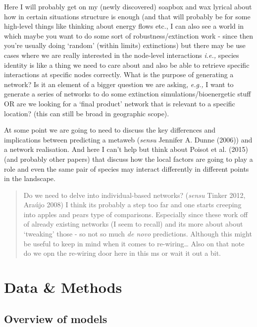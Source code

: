 \documentclass[
]{agujournal2019}
\begin{document}
Here I will probably get on my (newly discovered) soapbox and wax
lyrical about how in certain situations structure is enough (and that
will probably be for some high-level things like thinking about energy
flows etc., I can also see a world in which maybe you want to do some
sort of robustness/extinction work - since then you're usually doing
`random' (within limits) extinctions) but there may be use cases where
we are really interested in the node-level interactions \emph{i.e.,}
species identity is like a thing we need to care about and also be able
to retrieve specific interactions at specific nodes correctly. What is
the purpose of generating a network? Is it an element of a bigger
question we are asking, \emph{e.g.,} I want to generate a series of
networks to do some extinction simulations/bioenergetic stuff OR are we
looking for a `final product' network that is relevant to a specific
location? (this can still be broad in geographic scope).

At some point we are going to need to discuss the key differences and
implications between predicting a metaweb (\emph{sensu} Jennifer A.
Dunne (2006)) and a network realisation. And here I can't help but think
about Poisot et al. (2015) (and probably other papers) that discuss how
the local factors are going to play a role and even the same pair of
species may interact differently in different points in the landscape.

\begin{quote}
Do we need to delve into individual-based networks? (\emph{sensu} Tinker
2012, Araújo 2008) I think its probably a step too far and one starts
creeping into apples and pears type of comparisons. Especially since
these work off of already existing networks (I seem to recall) and its
more about about `tweaking' those - so not so much \emph{de novo}
predictions. Although this might be useful to keep in mind when it comes
to re-wiring\ldots{} Also on that note do we opn the re-wiring door here
in this ms or wait it out a bit.
\end{quote}

\section{Data \& Methods}\label{sec-data-methods}

\subsection{Overview of models}\label{overview-of-models}
\end{document}
